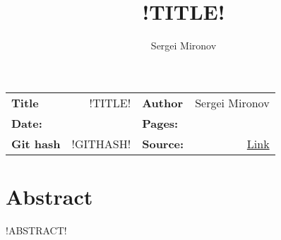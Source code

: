 \documentclass{article}
\title{!TITLE!}
\author{Sergei Mironov}
\begin{document}
\begin{center}
\begin{tabular}{l r | l r}
\textbf{Title} & !TITLE! & \textbf{Author} & Sergei Mironov \\
\textbf{Date:} & \localdate{\today} & \textbf{Pages:} & \pageref{LastPage} \\
\textbf{Git hash} & !GITHASH! & \textbf{Source:} & \href{https://github.com/sergei-mironov/technotes/blob/main/tex/!BODYFILE!}{Link} \\
\end{tabular}
\end{center}

\vsp

\makeatletter
\begin{center}
  \LARGE \bfseries \@title
\end{center}
\makeatother

\section*{Abstract}

!ABSTRACT!

\tableofcontents



\printbibliography
\end{document}

